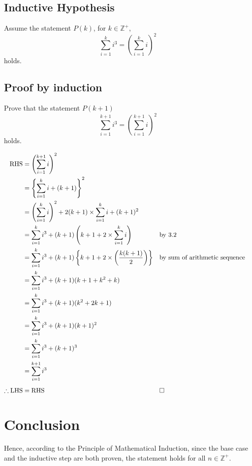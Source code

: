 \documentclass [12pt] {article}
\begin{document}
\subsection{Inductive Hypothesis}
Assume the statement $P(k)$, for $k \in \mathbb{Z}^+$,
\begin{equation}
    \sum_{i=1}^{k} i^3 = \left(\sum_{i=1}^{k}i\right)^2
\end{equation}
holds.

\subsection{Proof by induction}
Prove that the statement $P(k+1)$
\begin{equation}
    \sum_{i=1}^{k+1} i^3 = \left(\sum_{i=1}^{k+1}i\right)^2
\end{equation}
holds.
 
\begin{align*}
    \text{RHS} &= \left(\sum_{i=1}^{k+1}i\right)^2 \\
    &= \left\{\sum_{i=1}^{k}i + (k+1)\right\}^2 \\
    &= \left(\sum_{i=1}^ki\right)^2 + 2(k+1) \times \sum_{i=1}^ki + (k+1)^2 \\
    &= \sum_{i=1}^{k}i^3 + (k+1)\left(k+1+2 \times \sum_{i=1}^{k}i\right) && \text{by 3.2} \\
    &= \sum_{i=1}^{k}i^3 + (k+1)\left\{k+1+2 \times \left(\frac{k(k+1)}{2}\right)\right\} && \text{by sum of arithmetic sequence} \\
    &= \sum_{i=1}^{k}i^3 + (k+1)(k+1+k^2+k) \\
    &= \sum_{i=1}^{k}i^3 + (k+1)(k^2+2k+1) \\
    &= \sum_{i=1}^{k}i^3 + (k+1)(k+1)^2 \\
    &= \sum_{i=1}^{k}i^3 + (k+1)^3 \\
    &= \sum_{i=1}^{k+1}i^3 \\[0.5em]
    \therefore \text{LHS} &= \text{RHS} &&\hfill \square
\end{align*}

\section{Conclusion}
Hence, according to the Principle of Mathematical Induction, since the base case and the inductive step are both proven, the statement holds for all \(n \in \mathbb{Z}^+\).
\end{document}
